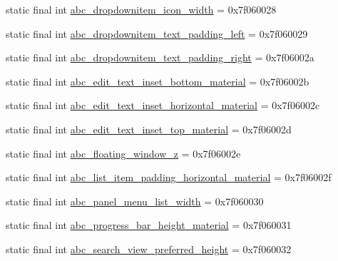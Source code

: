 \begin{DoxyCompactItemize}
\item 
static final int \mbox{\hyperlink{classandroid_1_1support_1_1v7_1_1appcompat_1_1R_1_1dimen_ac3283f5b742838d313ac74aa12c129ca}{abc\+\_\+dropdownitem\+\_\+icon\+\_\+width}} = 0x7f060028
\item 
static final int \mbox{\hyperlink{classandroid_1_1support_1_1v7_1_1appcompat_1_1R_1_1dimen_ab4f69e00dfa34a3c6f6a34a4f39275f8}{abc\+\_\+dropdownitem\+\_\+text\+\_\+padding\+\_\+left}} = 0x7f060029
\item 
static final int \mbox{\hyperlink{classandroid_1_1support_1_1v7_1_1appcompat_1_1R_1_1dimen_ad783efb42893731cf1f7f809ba1c0d5b}{abc\+\_\+dropdownitem\+\_\+text\+\_\+padding\+\_\+right}} = 0x7f06002a
\item 
static final int \mbox{\hyperlink{classandroid_1_1support_1_1v7_1_1appcompat_1_1R_1_1dimen_ad747a841e96560a696e4012d696d2ac1}{abc\+\_\+edit\+\_\+text\+\_\+inset\+\_\+bottom\+\_\+material}} = 0x7f06002b
\item 
static final int \mbox{\hyperlink{classandroid_1_1support_1_1v7_1_1appcompat_1_1R_1_1dimen_ae52f73ef5d27d41b72d8a3e2cc9d2b5a}{abc\+\_\+edit\+\_\+text\+\_\+inset\+\_\+horizontal\+\_\+material}} = 0x7f06002c
\item 
static final int \mbox{\hyperlink{classandroid_1_1support_1_1v7_1_1appcompat_1_1R_1_1dimen_a8f3a30511f3e727e28bf89d5a1bbc5d3}{abc\+\_\+edit\+\_\+text\+\_\+inset\+\_\+top\+\_\+material}} = 0x7f06002d
\item 
static final int \mbox{\hyperlink{classandroid_1_1support_1_1v7_1_1appcompat_1_1R_1_1dimen_a69393494aeb17e1317ac34e42fc20862}{abc\+\_\+floating\+\_\+window\+\_\+z}} = 0x7f06002e
\item 
static final int \mbox{\hyperlink{classandroid_1_1support_1_1v7_1_1appcompat_1_1R_1_1dimen_a413d6f0f1c60575b7369e9e448283c02}{abc\+\_\+list\+\_\+item\+\_\+padding\+\_\+horizontal\+\_\+material}} = 0x7f06002f
\item 
static final int \mbox{\hyperlink{classandroid_1_1support_1_1v7_1_1appcompat_1_1R_1_1dimen_ac1eb537985c0762039ad7dfc84d7a94f}{abc\+\_\+panel\+\_\+menu\+\_\+list\+\_\+width}} = 0x7f060030
\item 
static final int \mbox{\hyperlink{classandroid_1_1support_1_1v7_1_1appcompat_1_1R_1_1dimen_a365c3d062a342b9950c6dca70badd6fd}{abc\+\_\+progress\+\_\+bar\+\_\+height\+\_\+material}} = 0x7f060031
\item 
static final int \mbox{\hyperlink{classandroid_1_1support_1_1v7_1_1appcompat_1_1R_1_1dimen_ab855b029bb245c83debdcc554a7b40e7}{abc\+\_\+search\+\_\+view\+\_\+preferred\+\_\+height}} = 0x7f060032

\end{DoxyCompactItemize}
